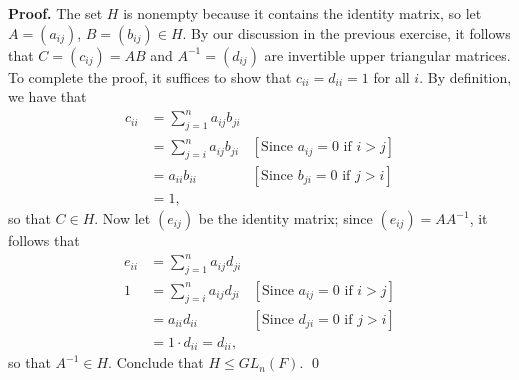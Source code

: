 \begin{enumerate}
      \textbf{Proof.} The set $H$ is nonempty because it contains the identity
      matrix, so let $A = (a_{ij})$, $B = (b_{ij}) \in H$. By our discussion in
      the previous exercise, it follows that $C = (c_{ij}) = AB$ and
      $A^{-1} = (d_{ij})$ are invertible upper triangular matrices. To complete
      the proof, it suffices to show that $c_{ii} = d_{ii} = 1$ for all $i$. By
      definition, we have that
      \begin{align*}
         c_{ii} &= \sum_{j=1}^na_{ij}b_{ji} \\
           &= \sum_{j=i}^na_{ij}b_{ji}
               &[\text{Since }a_{ij} = 0 \text{ if } i > j] \\
            &= a_{ii}b_{ii} &[\text{Since } b_{ji} = 0 \text{ if } j > i] \\
            &= 1,
      \end{align*}
      so that $C \in H$. Now let $(e_{ij})$ be the identity matrix; since
      $(e_{ij}) = AA^{-1}$, it follows that
      \begin{align*}
         e_{ii} &= \sum_{j=1}^na_{ij}d_{ji} \\
         1  &= \sum_{j=i}^na_{ij}d_{ji}
               &[\text{Since }a_{ij} = 0 \text{ if } i > j] \\
            &= a_{ii}d_{ii} &[\text{Since } d_{ji} = 0 \text{ if } j > i] \\
            &= 1 \cdot d_{ii} = d_{ii},
      \end{align*}
      so that $A^{-1} \in H$. Conclude that $H \le GL_n(F)$. \qed  
\end{enumerate}
